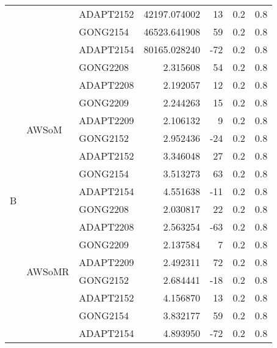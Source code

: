 \begin{tabular}{lllrrrr}
  &        & ADAPT2152 &  42197.074002 &     13 &   0.2 &   0.8 \\
  &        & GONG2154 &  46523.641908 &     59 &   0.2 &   0.8 \\
  &        & ADAPT2154 &  80165.028240 &    -72 &   0.2 &   0.8 \\
\cline{1-7}
\cline{2-7}
\multirow{16}{*}{B} & \multirow{8}{*}{AWSoM} & GONG2208 &      2.315608 &     54 &   0.2 &   0.8 \\
  &        & ADAPT2208 &      2.192057 &     12 &   0.2 &   0.8 \\
  &        & GONG2209 &      2.244263 &     15 &   0.2 &   0.8 \\
  &        & ADAPT2209 &      2.106132 &      9 &   0.2 &   0.8 \\
  &        & GONG2152 &      2.952436 &    -24 &   0.2 &   0.8 \\
  &        & ADAPT2152 &      3.346048 &     27 &   0.2 &   0.8 \\
  &        & GONG2154 &      3.513273 &     63 &   0.2 &   0.8 \\
  &        & ADAPT2154 &      4.551638 &    -11 &   0.2 &   0.8 \\
\cline{2-7}
  & \multirow{8}{*}{AWSoMR} & GONG2208 &      2.030817 &     22 &   0.2 &   0.8 \\
  &        & ADAPT2208 &      2.563254 &    -63 &   0.2 &   0.8 \\
  &        & GONG2209 &      2.137584 &      7 &   0.2 &   0.8 \\
  &        & ADAPT2209 &      2.492311 &     72 &   0.2 &   0.8 \\
  &        & GONG2152 &      2.684441 &    -18 &   0.2 &   0.8 \\
  &        & ADAPT2152 &      4.156870 &     13 &   0.2 &   0.8 \\
  &        & GONG2154 &      3.832177 &     59 &   0.2 &   0.8 \\
  &        & ADAPT2154 &      4.893950 &    -72 &   0.2 &   0.8 \\
\bottomrule
\end{tabular}
